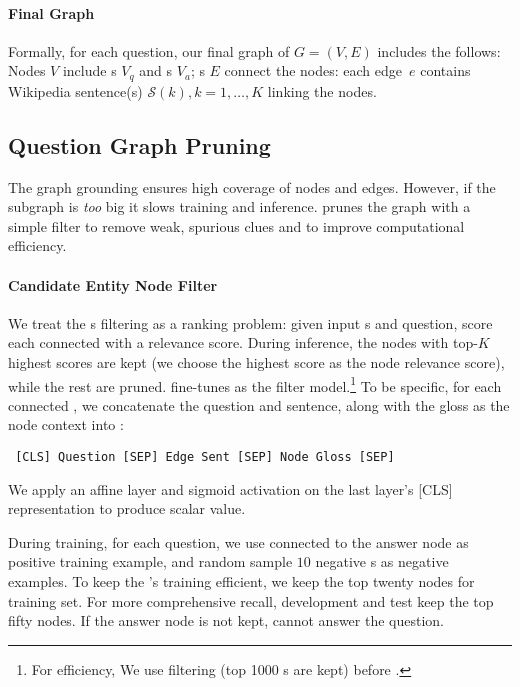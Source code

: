 \paragraph{Final Graph}

Formally, for each question, our final graph of \name{} $G =(V, E)$
includes the follows:
%  
Nodes $V$ include \leftnode{}s $V_q$ and \rightnode{}s
$V_a$;
%
\tweennode{}s $E$ connect the nodes: each edge~$e$ contains Wikipedia
sentence(s) $\mathcal{S}({k}), k= 1,\dots, K$ linking the nodes.

\subsection{Question Graph Pruning} 


The graph grounding ensures high coverage of nodes and edges.
%
However, if the subgraph is \emph{too} big it slows training and inference.
\name{} prunes the graph with a simple filter to remove weak, 
spurious clues and to improve computational efficiency.

\paragraph{Candidate Entity Node Filter}

We treat the \rightnode{}s filtering as a ranking problem: given input
\rightnode{}s and question, score each connected \tweennode{} with a relevance score. 
%
During inference, the nodes with top-$K$ highest scores are kept (we choose the highest \tweennode{} score as the node relevance score), while
the rest are pruned. 
%
\name{} fine-tunes  as the filter model.\footnote{For efficiency, We use  filtering (top 1000 \tweennode{}s are kept) before .}
%
To be specific, for each connected \tweennode{},
we concatenate the question and sentence, along with the \rightnode{}
gloss as the node context into :
%
\begin{verbatim}
 [CLS] Question [SEP] Edge Sent [SEP] Node Gloss [SEP]
\end{verbatim}
We apply an affine layer and sigmoid 
activation on the last layer's 
[CLS] representation to produce scalar value.



During training, for each question, we use \tweennode{} connected to the answer node as positive
training example, and random sample $10$ negative \tweennode{}s as
negative examples. To keep the \name{}'s  training efficient,
we keep the top twenty nodes 
 for training set. For more
comprehensive recall, development and test keep the top fifty nodes.
If the answer node is not kept, \name{} cannot answer the question.


